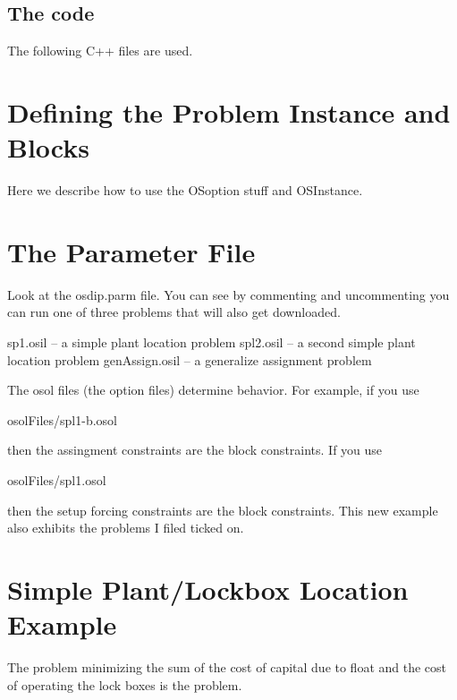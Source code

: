 \documentclass[11pt]{article}
\renewcommand{\_}{{\char"5F}}
\renewcommand{\{}{{\char"7B}}
\renewcommand{\}}{{\char"7D}}
\renewcommand{\^}{{\char"0D}}
\renewcommand{\'}{{\char"0D}}
\begin{document}
\subsection{The code}

The following C++ files are used.

\vskip 8pt
\noindent {\bf OSDip\_Main.cpp}


\vskip 8pt

\vskip 8pt

\vskip 8pt

\vskip 8pt


 

\section{Defining the Problem Instance and Blocks}\label{section:defineinstance}

Here we describe how to use the OSoption stuff and OSInstance.

\section{The Parameter File}\label{section:paramaterfile}

Look at the osdip.parm file. You can see by commenting and uncommenting you can
run one of three problems that will also get downloaded.

sp1.osil -- a simple plant location problem spl2.osil -- a second simple plant
location problem genAssign.osil -- a generalize assignment problem

The osol files (the option files) determine behavior. For example, if you use

osolFiles/spl1-b.osol

then the assingment constraints are the block constraints. If you use

osolFiles/spl1.osol

then the setup forcing constraints are the block constraints.  This  new  example
also exhibits the problems I filed ticked on.


\section{Simple Plant/Lockbox Location Example}


 The problem minimizing
the sum of the cost of capital due to float  and the cost of operating the lock boxes is the
 problem.  
\end{document}
